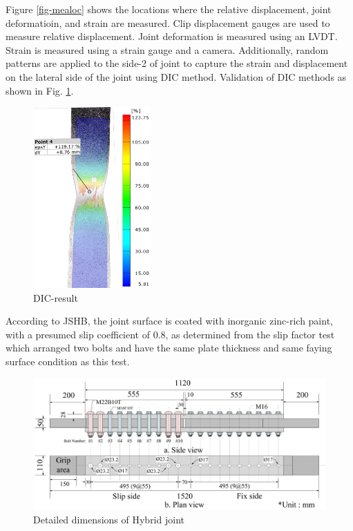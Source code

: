Figure \ref{fig-mealoc} shows the locations where the relative displacement, joint deformatioin, and strain are measured. Clip displacement gauges are used to measure relative displacement. Joint deformation is measured using an LVDT. Strain is measured using a strain gauge and a camera. Additionally, random patterns are applied to the side-2 of joint to capture the strain and displacement on the lateral side of the joint using \ac{DIC} method. Validation of \ac{DIC} methods as shown in Fig. \ref{fig-dicresult}.

\begin{figure}
    \centering
    \includegraphics[width=0.4\textwidth]{imgs/ch6/DIC-RESULT.jpg}
    \caption{DIC-result}
    \label{fig-dicresult}
\end{figure}


According to JSHB\cite{douji2017}, the joint surface is coated with inorganic zinc-rich paint, with a presumed slip coefficient of 0.8, as determined from the slip factor test which arranged two bolts and have the same plate thickness and same faying surface condition as this test.

\begin{figure}
    \centering
    \includegraphics[width=\textwidth]{imgs/ch6/dimensions.pdf}
    \caption{Detailed dimensions of Hybrid joint}
    \label{fig-dimens}
\end{figure}

